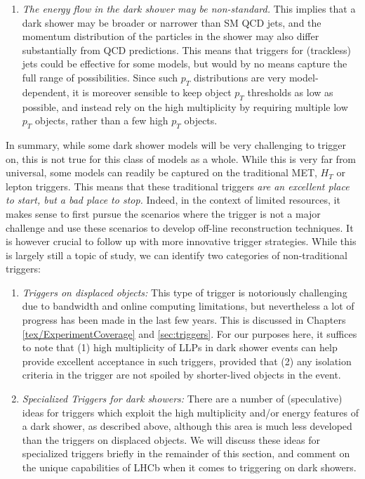 \begin{enumerate}
\item \emph{The energy flow in the dark shower may be non-standard.} This implies that a dark shower may be broader or narrower than SM QCD jets, and the momentum distribution of the particles in the shower may also differ substantially from QCD predictions. This means that triggers for (trackless) jets could be effective for some models, but would by no means capture the full range of possibilities. Since such $p_T$ distributions are very model-dependent, it is moreover sensible to keep object $p_T$ thresholds as low as possible, and instead rely on the high multiplicity by requiring multiple low $p_T$ objects, rather than a few high $p_T$ objects. 
\end{enumerate}

In summary, while some dark shower models will be very challenging to trigger on, this is not true for this class of models as a whole. While this is very far from universal, some models can readily be captured on the traditional MET, $H_T$ or lepton triggers. This means that these traditional triggers \emph{are an excellent place to start, but a bad place to stop.} Indeed, in the context of limited resources, it makes sense to first pursue the scenarios where the trigger is not a major challenge and use these scenarios to develop off-line reconstruction techniques. It is however crucial to follow up with more innovative trigger strategies. While this is largely still a topic of study, we can identify two categories of non-traditional triggers:
\begin{enumerate}
\item \emph{Triggers on displaced objects:} This type of trigger is notoriously challenging due to bandwidth and online computing limitations, but nevertheless a lot of progress has been made in the last few years. This is discussed in Chapters \ref{tex/ExperimentCoverage} and \ref{sec:triggers}.  For our purposes here, it suffices to note that (1) high multiplicity of LLPs in dark shower events can help provide excellent acceptance in such triggers, provided that (2) any isolation criteria in the trigger are not spoiled by shorter-lived objects in the event.

\item \emph{Specialized Triggers for dark showers:} There are a number of (speculative) ideas for triggers which exploit the high multiplicity and/or energy features of a dark shower, as described above, although this area is much less developed than the triggers on displaced objects. We will discuss these ideas for specialized triggers briefly in the remainder of this section, and comment on the unique capabilities of LHCb when it comes to triggering on dark showers. 


\end{enumerate}



